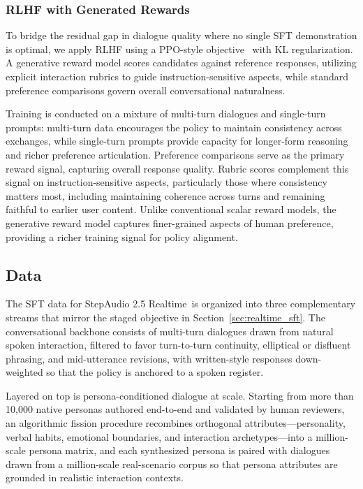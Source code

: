 \documentclass{llmxive}
\providecommand{\steprealtime}{\mbox{StepAudio} 2.5 Realtime}
\begin{document}
\subsubsection{RLHF with Generated Rewards}
To bridge the residual gap in dialogue quality where no single SFT demonstration is optimal, we apply RLHF using a PPO-style objective~\citep{schulman2017proximal} with KL regularization. A generative reward model scores candidates against reference responses, utilizing explicit interaction rubrics to guide instruction-sensitive aspects, while standard preference comparisons govern overall conversational naturalness.

Training is conducted on a mixture of multi-turn dialogues and single-turn prompts: multi-turn data encourages the policy to maintain consistency across exchanges, while single-turn prompts provide capacity for longer-form reasoning and richer preference articulation. Preference comparisons serve as the primary reward signal, capturing overall response quality. Rubric scores complement this signal on instruction-sensitive aspects, particularly those where consistency matters most, including maintaining coherence across turns and remaining faithful to earlier user content. Unlike conventional scalar reward models, the generative reward model captures finer-grained aspects of human preference, providing a richer training signal for policy alignment.

\subsection{Data}
The SFT data for \steprealtime\ is organized into three complementary streams that mirror the staged objective in Section~\ref{sec:realtime_sft}. The conversational backbone consists of multi-turn dialogues drawn from natural spoken interaction, filtered to favor turn-to-turn continuity, elliptical or disfluent phrasing, and mid-utterance revisions, with written-style responses down-weighted so that the policy is anchored to a spoken register.

Layered on top is persona-conditioned dialogue at scale. Starting from more than 10{,}000 native personas authored end-to-end and validated by human reviewers, an algorithmic fission procedure recombines orthogonal attributes—personality, verbal habits, emotional boundaries, and interaction archetypes—into a million-scale persona matrix, and each synthesized persona is paired with dialogues drawn from a million-scale real-scenario corpus so that persona attributes are grounded in realistic interaction contexts.
\end{document}

